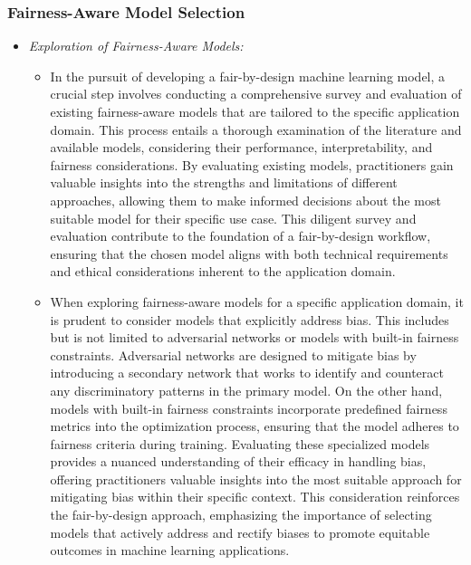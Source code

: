 
\subsubsection{Fairness-Aware Model Selection}

\begin{itemize}

    \item \emph{Exploration of Fairness-Aware Models:}
     
    \begin{itemize}
    
        \item In the pursuit of developing a fair-by-design machine learning model, a crucial step involves conducting a comprehensive survey and evaluation of existing fairness-aware models that are tailored to the specific application domain. This process entails a thorough examination of the literature and available models, considering their performance, interpretability, and fairness considerations. By evaluating existing models, practitioners gain valuable insights into the strengths and limitations of different approaches, allowing them to make informed decisions about the most suitable model for their specific use case. This diligent survey and evaluation contribute to the foundation of a fair-by-design workflow, ensuring that the chosen model aligns with both technical requirements and ethical considerations inherent to the application domain.
    
        \item When exploring fairness-aware models for a specific application domain, it is prudent to consider models that explicitly address bias. This includes but is not limited to adversarial networks or models with built-in fairness constraints. Adversarial networks are designed to mitigate bias by introducing a secondary network that works to identify and counteract any discriminatory patterns in the primary model. On the other hand, models with built-in fairness constraints incorporate predefined fairness metrics into the optimization process, ensuring that the model adheres to fairness criteria during training. Evaluating these specialized models provides a nuanced understanding of their efficacy in handling bias, offering practitioners valuable insights into the most suitable approach for mitigating bias within their specific context. This consideration reinforces the fair-by-design approach, emphasizing the importance of selecting models that actively address and rectify biases to promote equitable outcomes in machine learning applications.
    

\end{itemize}
\end{itemize}

